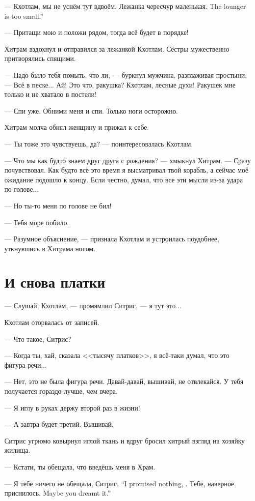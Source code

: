 --- Кхотлам, мы не уснём тут вдвоём.
{Лежанка чересчур маленькая.}
{The lounger is too small.''}

--- Притащи мою и положи рядом, тогда всё будет в порядке!

Хитрам вздохнул и отправился за лежанкой Кхотлам.
Сёстры мужественно притворялись спящими.

--- Надо было тебя помыть, что ли, --- буркнул мужчина, разглаживая простыни.
--- Всё в песке...
Ай!
Это что, ракушка?
Кхотлам, лесные духи!
Ракушек мне только и не хватало в постели!

--- Спи уже.
Обними меня и спи.
Только ноги осторожно.

Хитрам молча обнял женщину и прижал к себе.

--- Ты тоже это чувствуешь, да? --- поинтересовалась Кхотлам.

--- Что мы как будто знаем друг друга с рождения? --- хмыкнул Хитрам.
--- Сразу почувствовал.
Как будто всё это время я высматривал твой корабль, а сейчас моё ожидание подошло к концу.
Если честно, думал, что все эти мысли из-за удара по голове...

--- Но ты-то меня по голове не бил!

--- Тебя море побило.

--- Разумное объяснение, --- признала Кхотлам и устроилась поудобнее, уткнувшись в Хитрама носом.

\section{И снова платки}

--- Слушай, Кхотлам, --- промямлил Ситрис, --- я тут это...

Кхотлам оторвалась от записей.

--- Что такое, Ситрис?

--- Когда ты, хай, сказала <<тысячу платков>>, я всё-таки думал, что это фигура речи...

--- Нет, это не была фигура речи.
Давай-давай, вышивай, не отвлекайся.
У тебя получается гораздо лучше, чем вчера.

--- Я иглу в руках держу второй раз в жизни!

--- А завтра будет третий.
Вышивай.

Ситрис угрюмо ковырнул иглой ткань и вдруг бросил хитрый взгляд на хозяйку жилища.

--- Кстати, ты обещала, что введёшь меня в Храм.

{--- Я тебе ничего не обещала, Ситрис.}
{``I promised nothing, \Sitris.}
{Тебе, наверное, приснилось.}
{Maybe you dreamt it.''}

